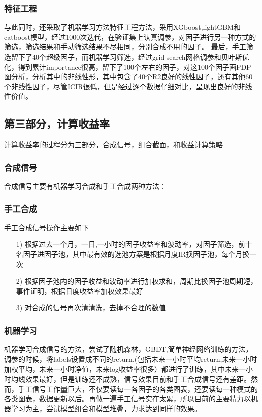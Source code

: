 \documentclass[11pt]{ctexart}
\begin{document}
\subsubsection{特征工程}
与此同时，还采取了机器学习方法特征工程方法，采用XGboost,lightGBM和catboost模型，经过1000次迭代，在验证集上认真调参，对因子进行另一种方式的筛选，筛选结果和手动筛选结果不尽相同，分别合成不用的因子。
最后，手工筛选留下了40个超级因子，而机器学习筛选，经过grid search网格调参和贝叶斯优化，得到累计importance很高，留下了100个左右的因子，对这100个因子画PDP图分析，分析其中的非线性形，其中包含了40个R2良好的线性因子，还有其他60个非线性因子，尽管ICIR很低，但是经过逐个数据仔细对比，呈现出良好的非线性价值。


\subsection{第三部分，计算收益率}
计算收益率的过程分为三部分，合成信号，组合截面，和收益计算策略

\subsubsection{合成信号}
合成信号主要有机器学习合成和手工合成两种方法：

\subsubsection{手工合成}
手工合成信号操作主要如下
\begin{itemize}
  \item [1)]
  根据过去一个月，一日,一小时的因子收益率和波动率，对因子筛选，前十名因子进因子池，其中最有效的选池方案是根据月度IR换因子池，每个月换一次
  \item [2)]
  根据因子池内的因子收益和波动率进行加权求和，周期比换因子池周期短，事件证明，根据日度收益率加权效果最好
  \item [3)]
  对合成的信号再次清清洗，去掉不合理的数值

\end{itemize}
\subsubsection{机器学习}
机器学习合成信号的方法，尝试了随机森林，GBDT,简单神经网络训练的方法，调参的时候，将labels设置成不同的return,(包括未来一小时平均return,未来一小时加权平均，未来一小时净值，未来log收益率很多）都进行了训练，其中未来一小时均线效果最好，但是训练还不成熟，信号效果目前和手工合成信号还有差距。然而，手工信号工作量巨大，不仅要读每一各因子的各类图表，还要读每一种模式的各类图表，数据更新以后。再做一遍手工信号实在太累，所以目前的主要精力以机器学习为主，尝试模型组合和模型堆叠，力求达到同样的效果。
\end{document}
